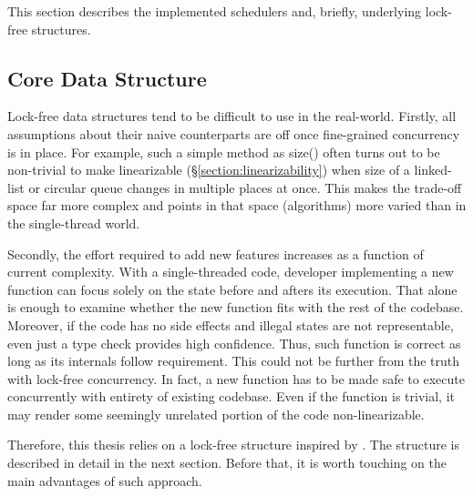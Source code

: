 \documentclass[12pt,a4paper,twoside]{report}
\begin{document}
This section describes the implemented schedulers and, briefly, underlying lock-free structures. 

\subsection{Core Data Structure}

Lock-free data structures tend to be difficult to use in the real-world. Firstly, all assumptions about their naive counterparts are off once fine-grained concurrency is in place. For example, such a simple method as size() often turns out to be non-trivial to make linearizable (\S\ref{section:linearizability}) when size of a linked-list or circular queue changes in multiple places at once. This makes the trade-off space far more complex and points in that space (algorithms) more varied than in the single-thread world.

Secondly, the effort required to add new features increases as a function of current complexity. With a single-threaded code, developer implementing a new function can focus solely on the state before and afters its execution. That alone is enough to examine whether the new function fits with the rest of the codebase. Moreover, if the code has no side effects and illegal states are not representable, even just a type check provides high confidence. Thus, such function is correct as long as its internals follow requirement. This could not be further from the truth with lock-free concurrency. In fact, a new function has to be made safe to execute concurrently with entirety of existing codebase. Even if the function is trivial, it may render some seemingly unrelated portion of the code non-linearizable. 

Therefore, this thesis relies on a lock-free structure inspired by \citet{Kappes2021}. The structure is described in detail in the next section. Before that, it is worth touching on the main advantages of such approach. 
\end{document}

